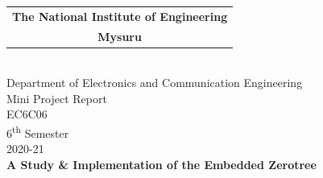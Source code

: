 \documentclass[a4paper,12pt]{report}
\begin{document}
\begin{titlepage}
    \begin{center}
        \noindent
        \hfill
        \begin{tabular}{@{}c@{}}
            \textbf{\Large The National Institute of Engineering} \\
            \textbf{\Large{Mysuru}}
        \end{tabular}
        \hfill
         \\
        \vspace{3.5cm}
        {\huge Department of Electronics and Communication Engineering} \\
        \vspace{2cm}
        \large{Mini Project Report} \\
        \large{EC6C06} \\
        \large{6\textsuperscript{th} Semester} \\
        \large{2020-21} \\
        \vspace{1cm}
        \textbf{\huge A Study \& Implementation of the Embedded Zerotree
}
\end{center}
\end{titlepage}
\end{document}
